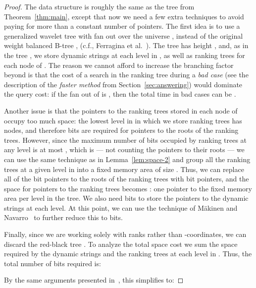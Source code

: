 \documentclass{llncs}
\begin{document}
\begin{proof}
  The data structure is roughly the same as the tree  from
  Theorem~\ref{thm:main}, except that now we need a few extra
  techniques to avoid paying for more than a constant number of
  pointers.  The first idea is to use a generalized wavelet tree 
  with fan out  over the universe , instead of the original weight balanced B-tree ,
  (c.f., Ferragina et al.~\cite{FMMN04}).  The tree  has height
  , and, as in the tree , we
  store dynamic strings  at each level in , as well as
  ranking trees for each node of .  The reason we cannot afford to
  increase the branching factor beyond  is that the cost of a search in the ranking tree during a
  \emph{bad case} (see the description of the \emph{faster method}
  from Section~\ref{sec:answering}) would dominate the query cost: if
  the fan out of  is , then the total time in bad cases can be
  .

  Another issue is that the pointers to the ranking trees stored in
  each node of  occupy too much space: the lowest level in  in
  which we store ranking trees has  nodes, and therefore  bits are required for
  pointers to the roots of the ranking trees.  However, since the
  maximum number of bits occupied by ranking trees at any level is at
  most , which is  --- not counting the pointers to their
  roots --- we can use the same technique as in
  Lemma~\ref{lem:space-2} and group all the ranking trees at a given
  level in  into a fixed memory area of size .  Thus, we can
  replace all of the  bit pointers to the roots of the ranking
  trees with  bit pointers, and the space for pointers to
  the ranking trees becomes :
  one pointer to the fixed memory area per level in the tree.  We also
  need  bits to store the pointers
  to the dynamic strings at each level.  At this point, we can use the
  technique of M{\"a}kinen and Navarro~\cite{MN06} to further reduce
  this to  bits.

  Finally, since we are working solely with ranks rather than
  -coordinates, we can discard the red-black tree .  To
  analyze the total space cost we sum the space required by the
  dynamic strings and the ranking trees at each level in .  Thus,
  the total number of bits required is:

\noindent
By the same arguments presented in~\cite{FMMN04}, this simplifies to:

\end{proof}
\end{document}
